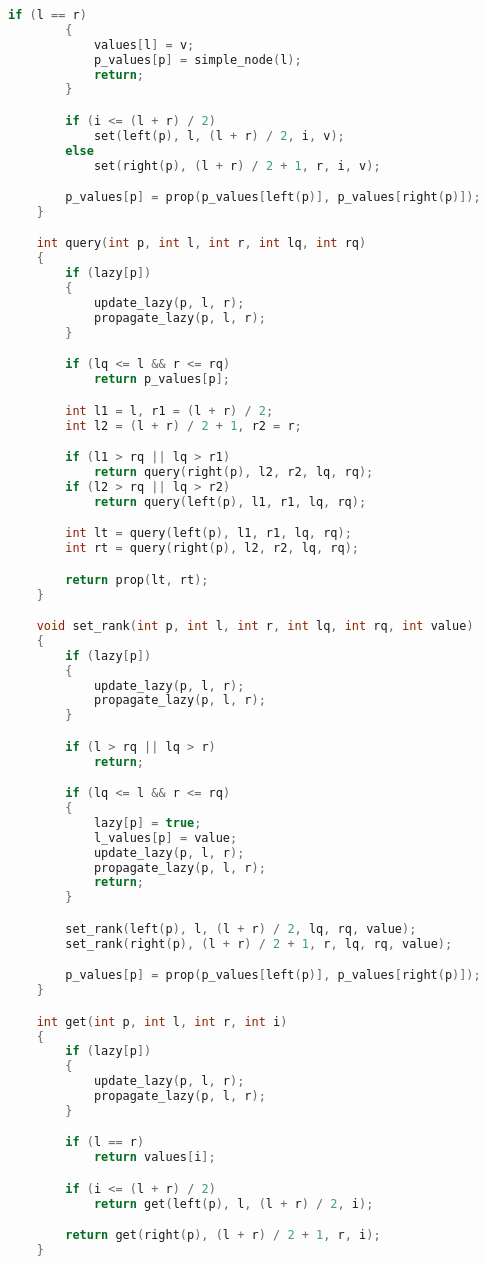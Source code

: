 \documentclass[leter]{amsart}
\begin{document}
\begin{multicols}{2}
\begin{lstlisting}[language=C++]
        if (l == r)
        {
            values[l] = v;
            p_values[p] = simple_node(l);
            return;
        }

        if (i <= (l + r) / 2)
            set(left(p), l, (l + r) / 2, i, v);
        else
            set(right(p), (l + r) / 2 + 1, r, i, v);

        p_values[p] = prop(p_values[left(p)], p_values[right(p)]);
    }

    int query(int p, int l, int r, int lq, int rq)
    {
        if (lazy[p])
        {
            update_lazy(p, l, r);
            propagate_lazy(p, l, r);
        }

        if (lq <= l && r <= rq)
            return p_values[p];

        int l1 = l, r1 = (l + r) / 2;
        int l2 = (l + r) / 2 + 1, r2 = r;

        if (l1 > rq || lq > r1)
            return query(right(p), l2, r2, lq, rq);
        if (l2 > rq || lq > r2)
            return query(left(p), l1, r1, lq, rq);

        int lt = query(left(p), l1, r1, lq, rq);
        int rt = query(right(p), l2, r2, lq, rq);

        return prop(lt, rt);
    }

    void set_rank(int p, int l, int r, int lq, int rq, int value)
    {
        if (lazy[p])
        {
            update_lazy(p, l, r);
            propagate_lazy(p, l, r);
        }

        if (l > rq || lq > r)
            return;

        if (lq <= l && r <= rq)
        {
            lazy[p] = true;
            l_values[p] = value;
            update_lazy(p, l, r);
            propagate_lazy(p, l, r);
            return;
        }

        set_rank(left(p), l, (l + r) / 2, lq, rq, value);
        set_rank(right(p), (l + r) / 2 + 1, r, lq, rq, value);

        p_values[p] = prop(p_values[left(p)], p_values[right(p)]);
    }

    int get(int p, int l, int r, int i)
    {
        if (lazy[p])
        {
            update_lazy(p, l, r);
            propagate_lazy(p, l, r);
        }

        if (l == r)
            return values[i];

        if (i <= (l + r) / 2)
            return get(left(p), l, (l + r) / 2, i);

        return get(right(p), (l + r) / 2 + 1, r, i);
    }


\end{lstlisting}
\end{multicols}
\end{document}
